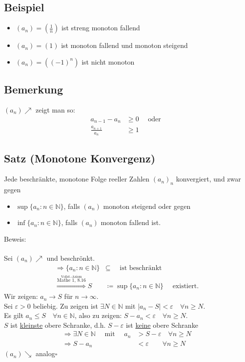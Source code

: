 \documentclass[12pt, titlepage]{article}
\newcommand{\N}{\mathds{N}}
\newcommand{\infn}{n\rightarrow\infty}
\renewcommand{\*}{\cdot}
\renewcommand{\epsilon}{\varepsilon}
\begin{document}
	\subsection{Beispiel}
	\begin{itemize}
		\item $(a_n)=(\frac{1}{n})$ ist streng monoton fallend
		\item $(a_n)=(1)$ ist monoton fallend und monoton steigend
		\item $(a_n)=((-1)^n)$ ist nicht monoton
	\end{itemize}
	\subsection{Bemerkung}
	$(a_n)\nearrow$ zeigt man so:
	\begin{align*}
		a_{n-1}-a_n&\geq0\quad\textrm{ oder }\\
		\frac{a_{n+1}}{a_n}&\geq1 
	\end{align*}
	\subsection{Satz (Monotone Konvergenz)}
	Jede beschränkte, monotone Folge reeller Zahlen $(a_n)_n$ konvergiert, und zwar gegen
	\begin{itemize}
		\item $\sup\{a_n\colon n\in\N\}$, falls $(a_n)$ monoton steigend oder gegen
		\item $\inf\{a_n\colon n\in\N\}$, falls $(a_n)$ monoton fallend ist.
	\end{itemize}
	Beweis:\\
	\\
	Sei $(a_n)\nearrow$ und beschrönkt.
	\begin{align*}
		\Rightarrow \{a_n\colon n\in\N\}&\subseteq\quad\textrm{ ist beschränkt}\\
		\overset{\overset{\textrm{Vollst.-Axiom}}{\textrm{Mathe 1, 8.16}}}{\Rightarrow}S&\coloneqq\sup\{a_n\colon n\in\N\}\quad\textrm{ existiert.}
	\end{align*}
	Wir zeigen: $a_n\rightarrow S$ für $\infn$.\\
	Sei $\epsilon>0$ beliebig. Zu zeigen ist $\exists N\in\N$ mit $|a_n-S|<\epsilon\quad\forall n\geq N$.\\
	Es gilt $a_n\leq S\quad\forall n\in\N$, also zu zeigen: $S-a_n<\epsilon\quad\forall n\geq N$.\\
	$S$ ist \underline{kleinste} obere Schranke, d.h. $S-\epsilon$ ist \underline{keine} obere Schranke\\
	\begin{align*}
		\Rightarrow\exists N\in\N\quad\textrm{ mit }\quad a_n&>S-\epsilon\quad\forall n\geq N\\
		\Rightarrow S-a_n&<\epsilon\qquad\forall n\geq N
	\end{align*}
	$(a_n)\searrow$ analog\hfill$\square$
\end{document}

